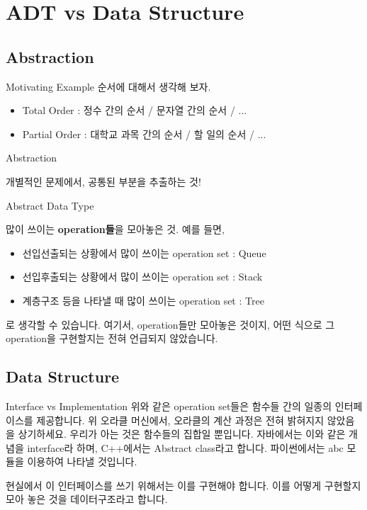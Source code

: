 \documentclass{beamer}
\begin{document}
\section{ADT vs Data Structure} 

\subsection{Abstraction}

\begin{frame}{Motivating Example}
순서에 대해서 생각해 보자. 
\begin{itemize} 
\item Total Order : 정수 간의 순서 / 문자열 간의 순서 / ... 
\item Partial Order : 대학교 과목 간의 순서 / 할 일의 순서 / ... 
\end{itemize}
\end{frame}

\begin{frame}{Abstraction} 

개별적인 문제에서, 공통된 부분을 추출하는 것! 

\end{frame}

\begin{frame}{Abstract Data Type}

많이 쓰이는 \textbf{operation들}을 모아놓은 것. 예를 들면, 

\begin{itemize} 
\item 선입선출되는 상황에서 많이 쓰이는 operation set : Queue
\item 선입후출되는 상황에서 많이 쓰이는 operation set : Stack
\item 계층구조 등을 나타낼 때 많이 쓰이는 operation set : Tree
\end{itemize}

로 생각할 수 있습니다. 여기서, operation들만 모아놓은 것이지, 어떤 식으로 그 operation을 구현할지는 전혀 언급되지 않았습니다. 
\end{frame}

\subsection{Data Structure} 

\begin{frame}{Interface vs Implementation} 
위와 같은 operation set들은 함수들 간의 일종의 인터페이스를 제공합니다. 위 오라클 머신에서, 오라클의 계산 과정은 전혀 밝혀지지 않았음을 상기하세요. 우리가 아는 것은 함수들의 집합일 뿐입니다. 자바에서는 이와 같은 개념을 interface라 하며, C++에서는 Abstract class라고 합니다. 파이썬에서는 abc 모듈을 이용하여 나타낼 것입니다. 

현실에서 이 인터페이스를 쓰기 위해서는 이를 구현해야 합니다. 이를 어떻게 구현할지 모아 놓은 것을 데이터구조라고 합니다. 
\end{frame}
\end{document}
